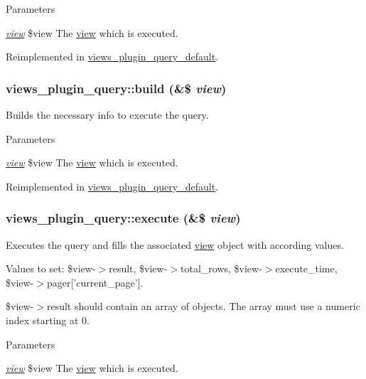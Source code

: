 \begin{DoxyParams}{Parameters}
\item[{\em \hyperlink{classview}{view}}]\$view The \hyperlink{classview}{view} which is executed. \end{DoxyParams}


Reimplemented in \hyperlink{classviews__plugin__query__default_aeff774a83f61292070594afc26f7a3e6}{views\_\-plugin\_\-query\_\-default}.\hypertarget{classviews__plugin__query_afe5f004315f6e60d76f7365407a49e45}{
\subsubsection[{build}]{\setlength{\rightskip}{0pt plus 5cm}views\_\-plugin\_\-query::build (\&\$ {\em view})}}
\label{classviews__plugin__query_afe5f004315f6e60d76f7365407a49e45}
Builds the necessary info to execute the query.


\begin{DoxyParams}{Parameters}
\item[{\em \hyperlink{classview}{view}}]\$view The \hyperlink{classview}{view} which is executed. \end{DoxyParams}


Reimplemented in \hyperlink{classviews__plugin__query__default_af0d7dc2d4f1ac47d99b153a7734e4a96}{views\_\-plugin\_\-query\_\-default}.\hypertarget{classviews__plugin__query_a9de6da4d1c256b88f8dc1a630332abe9}{
\subsubsection[{execute}]{\setlength{\rightskip}{0pt plus 5cm}views\_\-plugin\_\-query::execute (\&\$ {\em view})}}
\label{classviews__plugin__query_a9de6da4d1c256b88f8dc1a630332abe9}
Executes the query and fills the associated \hyperlink{classview}{view} object with according values.

Values to set: \$view-\/$>$result, \$view-\/$>$total\_\-rows, \$view-\/$>$execute\_\-time, \$view-\/$>$pager\mbox{[}'current\_\-page'\mbox{]}.

\$view-\/$>$result should contain an array of objects. The array must use a numeric index starting at 0.


\begin{DoxyParams}{Parameters}
\item[{\em \hyperlink{classview}{view}}]\$view The \hyperlink{classview}{view} which is executed. \end{DoxyParams}


